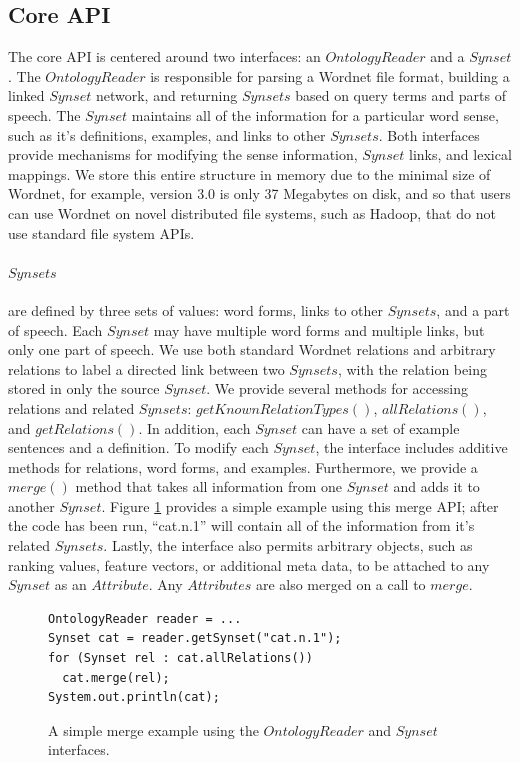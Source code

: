 \documentclass[a4paper,11pt]{article}
\begin{document}
\subsection{Core API}

The core API is centered around two interfaces: an $OntologyReader$ and a
$Synset$.  The $OntologyReader$ is responsible for parsing a Wordnet file
format, building a linked $Synset$ network, and returning $Synsets$ based on
query terms and parts of speech.  The $Synset$ maintains all of the information
for a particular word sense, such as it's definitions, examples, and links to
other $Synsets$. Both interfaces provide mechanisms for modifying the sense
information, $Synset$ links, and lexical mappings.  We store this entire
structure in memory due to the minimal size of Wordnet, for example, version 3.0
is only 37 Megabytes on disk, and so that users can use Wordnet on novel
distributed file systems, such as Hadoop, that do not use standard file system
APIs.

\paragraph{$Synsets$} are defined by three sets of values: word forms, links to other $Synsets$, and a part of speech.  Each $Synset$ may have
multiple word forms and multiple links, but only one part of speech.  
We use both standard Wordnet relations and arbitrary relations to label a directed link between two $Synsets$, with the relation being stored in only the source $Synset$.  
We provide several methods for accessing relations and related $Synsets$: $getKnownRelationTypes()$, $allRelations()$, and $getRelations()$. 
In addition, each $Synset$ can have
a set of example sentences and a definition.  To modify each $Synset$,
the interface includes additive methods for relations, word forms, and examples.  Furthermore,
we provide a $merge()$ method that takes all information from one $Synset$ and adds it to another $Synset$.   Figure \ref{fig:merge}
provides a simple example using this merge API; after the code has been run, ``cat.n.1'' will contain all of the information from it's related $Synsets$.
Lastly, the interface also permits arbitrary objects, such as ranking values,
feature vectors, or additional meta data, to be attached
to any $Synset$ as an $Attribute$.  Any $Attributes$ are also merged on a call to $merge$. 

\begin{figure}
\small
\begin{verbatim}
OntologyReader reader = ...
Synset cat = reader.getSynset("cat.n.1");
for (Synset rel : cat.allRelations())
  cat.merge(rel);
System.out.println(cat);
\end{verbatim}
\caption{A simple merge example using the $OntologyReader$ and $Synset$ interfaces.}
\label{fig:merge}
\end{figure}
\end{document}
